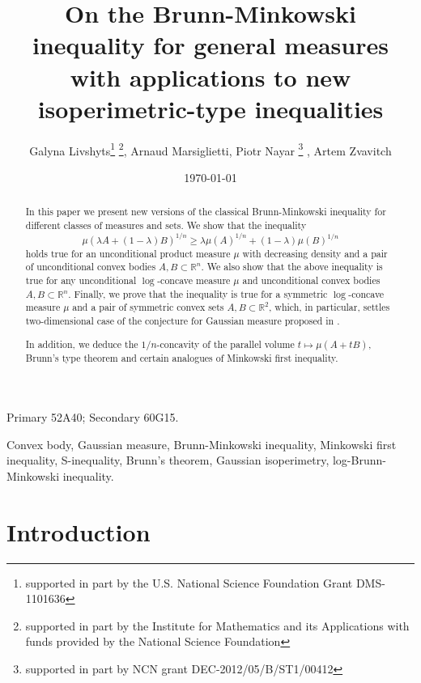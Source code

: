 \documentclass[11pt]{article}
\title{On the Brunn-Minkowski inequality for general measures with applications to new isoperimetric-type inequalities}
\author{Galyna Livshyts\thanks{ supported in part by the U.S. National Science
Foundation Grant DMS-1101636}  \thanks{supported in part by the Institute for Mathematics and its Applications with funds provided by the National Science Foundation}, Arnaud Marsiglietti\footnotemark[2], Piotr Nayar \thanks{supported in part by NCN grant DEC-2012/05/B/ST1/00412} \footnotemark[2], Artem Zvavitch\footnotemark[1]}
\date{\today}
\newcommand{\mb}[1]{\mathbb{{#1}}}
\newcommand{\1}{\mathbf{{1}}}
\theoremstyle{definition}
\begin{document}

\maketitle

\begin{abstract}
In this paper we present new versions of the classical Brunn-Minkowski inequality for different classes of measures and sets. We show that the inequality
\[
	\mu(\lambda A + (1-\lambda)B)^{1/n} \geq \lambda \mu(A)^{1/n} + (1-\lambda)\mu(B)^{1/n}
\]
holds true for an unconditional product measure $\mu$ with decreasing density and a pair of unconditional convex bodies $A,B \subset \mb{R}^n$. We also show that the above inequality is true for any unconditional $\log$-concave measure $\mu$ and unconditional convex bodies $A,B \subset \mb{R}^n$. Finally, we prove that the inequality is true for
a symmetric $\log$-concave measure $\mu$ and a pair of symmetric convex sets $A,B \subset \mb{R}^2$, which, in particular,  settles two-dimensional case of the conjecture for Gaussian measure proposed in \cite{GZ}.

In addition, we deduce the $1/n$-concavity of the parallel volume $t \mapsto \mu(A+tB)$, Brunn's type theorem and certain analogues of Minkowski first inequality.
\end{abstract}

  Primary 52A40; Secondary 60G15.

 Convex body, Gaussian measure, Brunn-Minkowski inequality, Minkowski first inequality, S-inequality, Brunn's theorem, Gaussian isoperimetry, log-Brunn-Minkowski inequality.

\vspace{1cm}

\section{Introduction}
\end{document}

